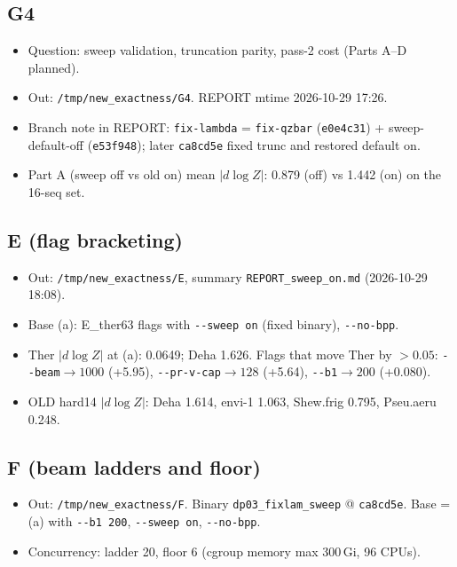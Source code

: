 \documentclass[11pt]{article}
\begin{document}
\subsection{G4}
\begin{itemize}[leftmargin=*]
  \item Question: sweep validation, truncation parity, pass-2 cost (Parts A--D planned).
  \item Out: \texttt{/tmp/new\_exactness/G4}. REPORT mtime 2026-10-29 17:26.
  \item Branch note in REPORT: \texttt{fix-lambda} = \texttt{fix-qzbar} (\texttt{e0e4c31}) + sweep-default-off (\texttt{e53f948}); later \texttt{ca8cd5e} fixed trunc and restored default on.
  \item Part A (sweep off vs old on) mean $|d\log Z|$: 0.879 (off) vs 1.442 (on) on the 16-seq set.
\end{itemize}

\subsection{E (flag bracketing)}
\begin{itemize}[leftmargin=*]
  \item Out: \texttt{/tmp/new\_exactness/E}, summary \texttt{REPORT\_sweep\_on.md} (2026-10-29 18:08).
  \item Base (a): E\_ther63 flags with \texttt{-{}-sweep on} (fixed binary), \texttt{-{}-no-bpp}.
  \item Ther $|d\log Z|$ at (a): 0.0649; Deha 1.626. Flags that move Ther by ${>}0.05$: \texttt{-{}-beam}${\to}1000$ (+5.95), \texttt{-{}-pr-v-cap}${\to}128$ (+5.64), \texttt{-{}-b1}${\to}200$ (+0.080).
  \item OLD hard14 $|d\log Z|$: Deha 1.614, envi-1 1.063, Shew.frig 0.795, Pseu.aeru 0.248.
\end{itemize}

\subsection{F (beam ladders and floor)}
\begin{itemize}[leftmargin=*]
  \item Out: \texttt{/tmp/new\_exactness/F}. Binary \texttt{dp03\_fixlam\_sweep} @ \texttt{ca8cd5e}. Base = (a) with \texttt{-{}-b1 200}, \texttt{-{}-sweep on}, \texttt{-{}-no-bpp}.
  \item Concurrency: ladder 20, floor 6 (cgroup memory max 300\,Gi, 96 CPUs).
\end{itemize}
\end{document}
